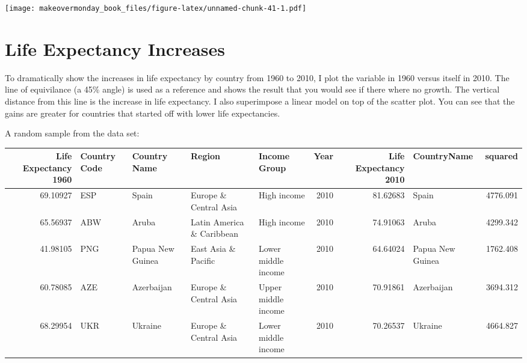\documentclass[]{book}
\theoremstyle{definition}
\theoremstyle{definition}
\theoremstyle{definition}
\theoremstyle{remark}
\begin{document}
\texttt{[image: makeovermonday\_book\_files/figure-latex/unnamed-chunk-41-1.pdf]}

\chapter{Life Expectancy Increases}\label{life-expectancy-increases}

To dramatically show the increases in life expectancy by country from
1960 to 2010, I plot the variable in 1960 versus itself in 2010. The
line of equivilance (a 45\% angle) is used as a reference and shows the
result that you would see if there where no growth. The vertical
distance from this line is the increase in life expectancy. I also
superimpose a linear model on top of the scatter plot. You can see that
the gains are greater for countries that started off with lower life
expectancies.

A random sample from the data set:

\begin{tabular}{r|l|l|l|l|r|r|l|r}
\hline
Life Expectancy 1960 & Country Code & Country Name & Region & Income Group & Year & Life Expectancy 2010 & CountryName & squared\\
\hline
69.10927 & ESP & Spain & Europe \& Central Asia & High income & 2010 & 81.62683 & Spain & 4776.091\\
\hline
65.56937 & ABW & Aruba & Latin America \& Caribbean & High income & 2010 & 74.91063 & Aruba & 4299.342\\
\hline
41.98105 & PNG & Papua New Guinea & East Asia \& Pacific & Lower middle income & 2010 & 64.64024 & Papua New Guinea & 1762.408\\
\hline
60.78085 & AZE & Azerbaijan & Europe \& Central Asia & Upper middle income & 2010 & 70.91861 & Azerbaijan & 3694.312\\
\hline
68.29954 & UKR & Ukraine & Europe \& Central Asia & Lower middle income & 2010 & 70.26537 & Ukraine & 4664.827\\
\hline
\end{tabular}
\end{document}
